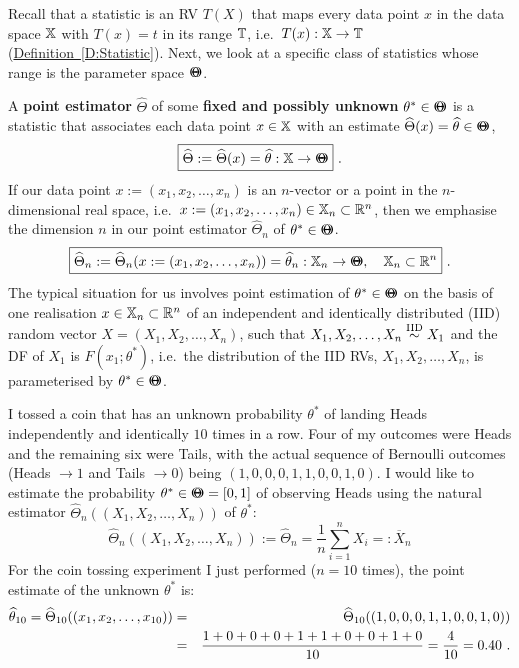 Recall that a statistic is an RV $T(X)$ that maps every data point $x$ in the data space $\mathbb{X}$ with $T(x)=t$ in its range $\mathbb{T}$, i.e.~$T(x):\mathbb{X} \to \mathbb{T}$ (\hyperref[D:Statistic]{Definition~\ref*{D:Statistic}}).  Next, we look at a specific class of statistics whose range is the parameter space ${\Theta}\mspace{-11 mu}{\Theta}$.
\begin{definition}\label{D:Estimator}
A {\bf point estimator} $\widehat{\Theta}$ of some {\bf fixed and possibly unknown} $\theta^* \in {\Theta}\mspace{-11 mu}{\Theta}$ is a statistic that associates each data point $x \in \mathbb{X}$ with an estimate $\widehat{\Theta}(x)=\widehat{\theta} \in {\Theta}\mspace{-11 mu}{\Theta}$,  
\[
\boxed{
 \widehat{\Theta} := \widehat{\Theta}(x)=\widehat{\theta}: \mathbb{X} \to {\Theta}\mspace{-11 mu}{\Theta}
 } \ .
\]
If our data point $x := (x_1,x_2,\ldots,x_n)$ is an $n$-vector or a point in the $n$-dimensional real space, i.e.~$x := (x_1,x_2,\ldots,x_n) \in \mathbb{X}_n \subset \mathbb{R}^n$, then we emphasise the dimension $n$ in our point estimator $\widehat{\Theta}_n$ of $\theta^* \in {\Theta}\mspace{-11 mu}{\Theta}$.
\[
\boxed{
\widehat{\Theta}_n :=  \widehat{\Theta}_n(x:=(x_1,x_2,\ldots,x_n))=\widehat{\theta}_n : \mathbb{X}_n \to {\Theta}\mspace{-11 mu}{\Theta}, \quad \mathbb{X}_n \subset \mathbb{R}^n 
} \ .
\]
 The typical situation for us involves point estimation of $\theta^* \in {\Theta}\mspace{-11 mu}{\Theta}$ on the basis of one realisation $x \in\mathbb{X}_n \subset \mathbb{R}^n$ of an independent and identically distributed (IID) random vector $X=(X_1,X_2,\ldots,X_n)$, such that $X_1,X_2,\ldots,X_n \overset{{\rm IID}}{\sim} X_1$ and the DF of $X_1$ is $F(x_1; \theta^*)$, i.e.~the distribution of the IID RVs, $X_1, X_2,\ldots,X_n$, is parameterised by $\theta^* \in {\Theta}\mspace{-11 mu}{\Theta}$.
\end{definition}

\begin{example}\label{EX:CoinTossing}
I tossed a coin that has an unknown probability $\theta^*$ of landing Heads independently and identically $10$ times in a row.  Four of my outcomes were Heads and the remaining six were Tails, with the actual sequence of Bernoulli outcomes (Heads $\to 1$ and Tails $\to 0$) being $(1,0,0,0,1,1,0,0,1,0)$.  I would like to estimate the probability $\theta^* \in {\Theta}\mspace{-11 mu}{\Theta} = [0,1]$ of observing Heads using the natural estimator $\widehat{\Theta}_n((X_1,X_2,\ldots,X_n))$ of $\theta^*$:
\[
\widehat{\Theta}_n((X_1,X_2,\ldots,X_n)) := \widehat{\Theta}_n = \frac{1}{n} \sum_{i=1}^n X_i =: \overline{X}_n
\]
For the coin tossing experiment I just performed ($n=10$ times), the point estimate of the unknown $\theta^*$ is:
\begin{eqnarray}
\widehat{\theta}_{10} = \widehat{\Theta}_{10}((x_1,x_2,\ldots,x_{10})) 
&=&\widehat{\Theta}_{10}((1,0,0,0,1,1,0,0,1,0)) \notag \\
&=& \frac{1+0+0+0+1+1+0+0+1+0}{10}=\frac{4}{10}=0.40 \notag \ .
\end{eqnarray}
\end{example}

